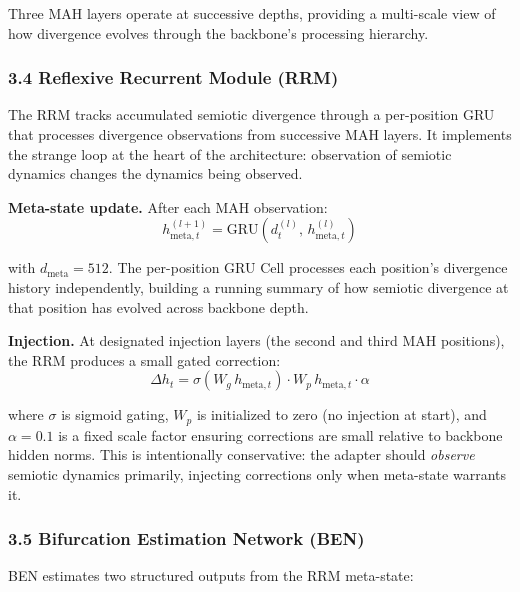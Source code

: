 \documentclass[
  11pt]{article}
\begin{document}
Three MAH layers operate at successive depths, providing a multi-scale
view of how divergence evolves through the backbone's processing
hierarchy.

\subsubsection{3.4 Reflexive Recurrent Module
(RRM)}\label{reflexive-recurrent-module-rrm}

The RRM tracks accumulated semiotic divergence through a per-position
GRU that processes divergence observations from successive MAH layers.
It implements the strange loop at the heart of the architecture:
observation of semiotic dynamics changes the dynamics being observed.

\textbf{Meta-state update.} After each MAH observation:
\[h_{\text{meta},t}^{(l+1)} = \text{GRU}(d_t^{(l)}, \, h_{\text{meta},t}^{(l)})\]

with \(d_{\text{meta}} = 512\). The per-position GRU Cell processes each
position's divergence history independently, building a running summary
of how semiotic divergence at that position has evolved across backbone
depth.

\textbf{Injection.} At designated injection layers (the second and third
MAH positions), the RRM produces a small gated correction:
\[\Delta h_t = \sigma(W_g \, h_{\text{meta},t}) \cdot W_p \, h_{\text{meta},t} \cdot \alpha\]

where \(\sigma\) is sigmoid gating, \(W_p\) is initialized to zero (no
injection at start), and \(\alpha = 0.1\) is a fixed scale factor
ensuring corrections are small relative to backbone hidden norms. This
is intentionally conservative: the adapter should \emph{observe}
semiotic dynamics primarily, injecting corrections only when meta-state
warrants it.

\subsubsection{3.5 Bifurcation Estimation Network
(BEN)}\label{bifurcation-estimation-network-ben}

BEN estimates two structured outputs from the RRM meta-state:
\end{document}
